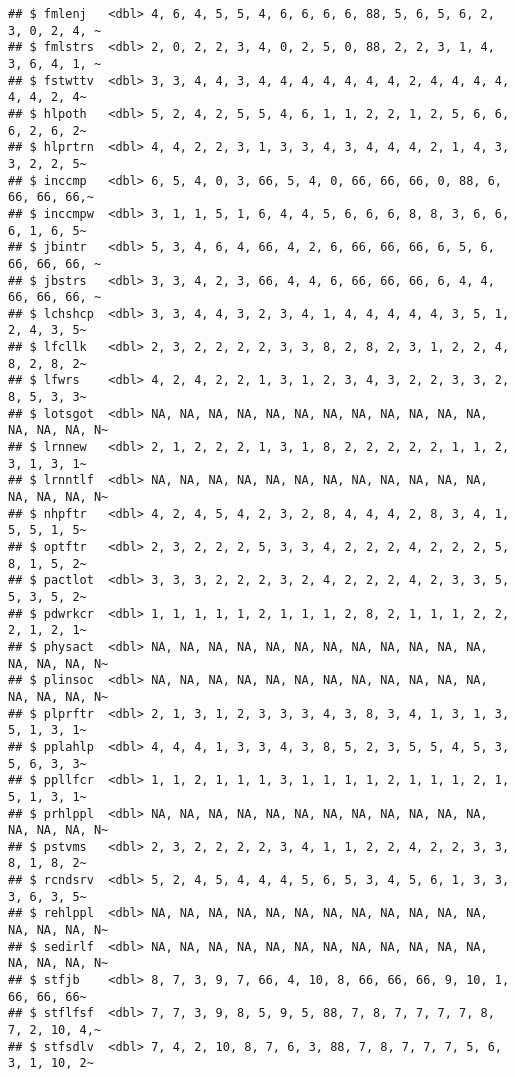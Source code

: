 \documentclass[
]{article}
\begin{document}
\begin{verbatim}
## $ fmlenj   <dbl> 4, 6, 4, 5, 5, 4, 6, 6, 6, 6, 88, 5, 6, 5, 6, 2, 3, 0, 2, 4, ~
## $ fmlstrs  <dbl> 2, 0, 2, 2, 3, 4, 0, 2, 5, 0, 88, 2, 2, 3, 1, 4, 3, 6, 4, 1, ~
## $ fstwttv  <dbl> 3, 3, 4, 4, 3, 4, 4, 4, 4, 4, 4, 4, 2, 4, 4, 4, 4, 4, 4, 2, 4~
## $ hlpoth   <dbl> 5, 2, 4, 2, 5, 5, 4, 6, 1, 1, 2, 2, 1, 2, 5, 6, 6, 6, 2, 6, 2~
## $ hlprtrn  <dbl> 4, 4, 2, 2, 3, 1, 3, 3, 4, 3, 4, 4, 4, 2, 1, 4, 3, 3, 2, 2, 5~
## $ inccmp   <dbl> 6, 5, 4, 0, 3, 66, 5, 4, 0, 66, 66, 66, 0, 88, 6, 66, 66, 66,~
## $ inccmpw  <dbl> 3, 1, 1, 5, 1, 6, 4, 4, 5, 6, 6, 6, 8, 8, 3, 6, 6, 6, 1, 6, 5~
## $ jbintr   <dbl> 5, 3, 4, 6, 4, 66, 4, 2, 6, 66, 66, 66, 6, 5, 6, 66, 66, 66, ~
## $ jbstrs   <dbl> 3, 3, 4, 2, 3, 66, 4, 4, 6, 66, 66, 66, 6, 4, 4, 66, 66, 66, ~
## $ lchshcp  <dbl> 3, 3, 4, 4, 3, 2, 3, 4, 1, 4, 4, 4, 4, 4, 3, 5, 1, 2, 4, 3, 5~
## $ lfcllk   <dbl> 2, 3, 2, 2, 2, 2, 3, 3, 8, 2, 8, 2, 3, 1, 2, 2, 4, 8, 2, 8, 2~
## $ lfwrs    <dbl> 4, 2, 4, 2, 2, 1, 3, 1, 2, 3, 4, 3, 2, 2, 3, 3, 2, 8, 5, 3, 3~
## $ lotsgot  <dbl> NA, NA, NA, NA, NA, NA, NA, NA, NA, NA, NA, NA, NA, NA, NA, N~
## $ lrnnew   <dbl> 2, 1, 2, 2, 2, 1, 3, 1, 8, 2, 2, 2, 2, 2, 1, 1, 2, 3, 1, 3, 1~
## $ lrnntlf  <dbl> NA, NA, NA, NA, NA, NA, NA, NA, NA, NA, NA, NA, NA, NA, NA, N~
## $ nhpftr   <dbl> 4, 2, 4, 5, 4, 2, 3, 2, 8, 4, 4, 4, 2, 8, 3, 4, 1, 5, 5, 1, 5~
## $ optftr   <dbl> 2, 3, 2, 2, 2, 5, 3, 3, 4, 2, 2, 2, 4, 2, 2, 2, 5, 8, 1, 5, 2~
## $ pactlot  <dbl> 3, 3, 3, 2, 2, 2, 3, 2, 4, 2, 2, 2, 4, 2, 3, 3, 5, 5, 3, 5, 2~
## $ pdwrkcr  <dbl> 1, 1, 1, 1, 1, 2, 1, 1, 1, 2, 8, 2, 1, 1, 1, 2, 2, 2, 1, 2, 1~
## $ physact  <dbl> NA, NA, NA, NA, NA, NA, NA, NA, NA, NA, NA, NA, NA, NA, NA, N~
## $ plinsoc  <dbl> NA, NA, NA, NA, NA, NA, NA, NA, NA, NA, NA, NA, NA, NA, NA, N~
## $ plprftr  <dbl> 2, 1, 3, 1, 2, 3, 3, 3, 4, 3, 8, 3, 4, 1, 3, 1, 3, 5, 1, 3, 1~
## $ pplahlp  <dbl> 4, 4, 4, 1, 3, 3, 4, 3, 8, 5, 2, 3, 5, 5, 4, 5, 3, 5, 6, 3, 3~
## $ ppllfcr  <dbl> 1, 1, 2, 1, 1, 1, 3, 1, 1, 1, 1, 2, 1, 1, 1, 2, 1, 5, 1, 3, 1~
## $ prhlppl  <dbl> NA, NA, NA, NA, NA, NA, NA, NA, NA, NA, NA, NA, NA, NA, NA, N~
## $ pstvms   <dbl> 2, 3, 2, 2, 2, 2, 3, 4, 1, 1, 2, 2, 4, 2, 2, 3, 3, 8, 1, 8, 2~
## $ rcndsrv  <dbl> 5, 2, 4, 5, 4, 4, 4, 5, 6, 5, 3, 4, 5, 6, 1, 3, 3, 3, 6, 3, 5~
## $ rehlppl  <dbl> NA, NA, NA, NA, NA, NA, NA, NA, NA, NA, NA, NA, NA, NA, NA, N~
## $ sedirlf  <dbl> NA, NA, NA, NA, NA, NA, NA, NA, NA, NA, NA, NA, NA, NA, NA, N~
## $ stfjb    <dbl> 8, 7, 3, 9, 7, 66, 4, 10, 8, 66, 66, 66, 9, 10, 1, 66, 66, 66~
## $ stflfsf  <dbl> 7, 7, 3, 9, 8, 5, 9, 5, 88, 7, 8, 7, 7, 7, 7, 8, 7, 2, 10, 4,~
## $ stfsdlv  <dbl> 7, 4, 2, 10, 8, 7, 6, 3, 88, 7, 8, 7, 7, 7, 5, 6, 3, 1, 10, 2~

\end{verbatim}
\end{document}
